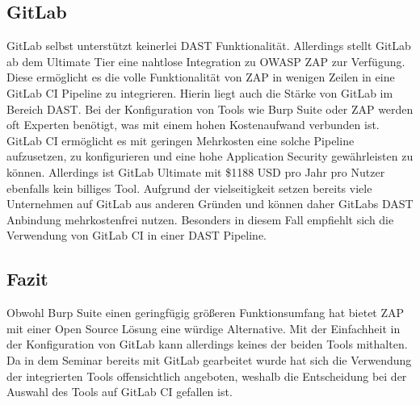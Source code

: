 \subsection{GitLab}

GitLab selbst unterstützt keinerlei DAST Funktionalität.
Allerdings stellt GitLab ab dem Ultimate Tier eine nahtlose Integration zu OWASP ZAP zur Verfügung.
Diese ermöglicht es die volle Funktionalität von ZAP in wenigen Zeilen in eine GitLab CI Pipeline zu integrieren.
Hierin liegt auch die Stärke von GitLab im Bereich DAST.
Bei der Konfiguration von Tools wie Burp Suite oder ZAP werden oft Experten benötigt, was mit einem hohen Kostenaufwand verbunden ist.
GitLab CI ermöglicht es mit geringen Mehrkosten eine solche Pipeline aufzusetzen, zu konfigurieren und eine hohe Application Security gewährleisten zu können.
Allerdings ist GitLab Ultimate mit \$1188 USD pro Jahr pro Nutzer ebenfalls kein billiges Tool.\cite{GitLabPricing}
Aufgrund der vielseitigkeit setzen bereits viele Unternehmen auf GitLab aus anderen Gründen und können daher GitLabs DAST Anbindung mehrkostenfrei nutzen.
Besonders in diesem Fall empfiehlt sich die Verwendung von GitLab CI in einer DAST Pipeline.

\subsection{Fazit}

Obwohl Burp Suite einen geringfügig größeren Funktionsumfang hat bietet ZAP mit einer Open Source Lösung eine würdige Alternative.
Mit der Einfachheit in der Konfiguration von GitLab kann allerdings keines der beiden Tools mithalten.
Da in dem Seminar bereits mit GitLab gearbeitet wurde hat sich die Verwendung der integrierten Tools offensichtlich angeboten, weshalb die Entscheidung bei der Auswahl des Tools auf GitLab CI gefallen ist.